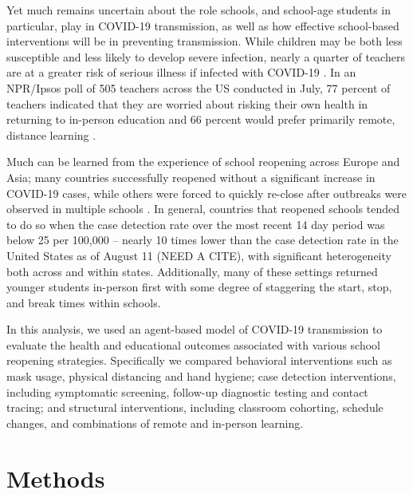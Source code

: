 \documentclass[preprint,12pt]{elsarticle}
\begin{document}
Yet much remains uncertain about the role schools, and school-age students in particular, play in COVID-19 transmission, as well as how effective school-based interventions will be in preventing transmission. While children may be both less susceptible and less likely to develop severe infection, nearly a quarter of teachers are at a greater risk of serious illness if infected with COVID-19 \cite{claxton_how_2020}. In an NPR/Ipsos poll of 505 teachers across the US conducted in July, 77 percent of teachers indicated that they are worried about risking their own health in returning to in-person education and 66 percent would prefer primarily remote, distance learning \cite{kamenetz_most_2020}.

Much can be learned from the experience of school reopening across Europe and Asia; many countries successfully reopened without a significant increase in COVID-19 cases, while others were forced to quickly re-close after outbreaks were observed in multiple schools \cite{vegas_reopening_2020, couzin-frankel_school_2020}. In general, countries that reopened schools tended to do so when the case detection rate over the most recent 14 day period was below 25 per 100,000 -- nearly 10 times lower than the case detection rate in the United States as of August 11 (NEED A CITE), with significant heterogeneity both across and within states. Additionally, many of these settings returned younger students in-person first with some degree of staggering the start, stop, and break times within schools.

In this analysis, we used an agent-based model of COVID-19 transmission to %
evaluate the health and educational outcomes associated with various school reopening strategies. Specifically we compared behavioral interventions such as mask usage, physical distancing and hand hygiene; case detection interventions, including symptomatic screening, follow-up diagnostic testing and contact tracing; and structural interventions, including classroom cohorting, schedule changes, and combinations of remote and in-person learning. %

\section{Methods}
\end{document}
